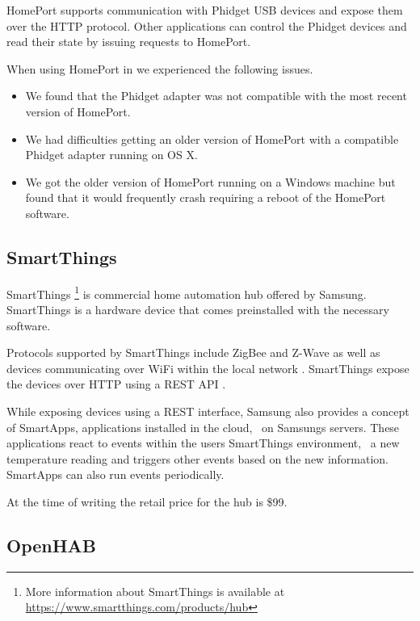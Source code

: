 HomePort supports communication with Phidget USB devices and expose them over the HTTP protocol. Other applications can control the Phidget devices and read their state by issuing requests to HomePort.

When using HomePort in \cite{prespecialisation} we experienced the following issues.

\begin{itemize}
\item We found that the Phidget adapter was not compatible with the most recent version of HomePort.
\item We had difficulties getting an older version of HomePort with a compatible Phidget adapter running on OS X.
\item We got the older version of HomePort running on a Windows machine but found that it would frequently crash requiring a reboot of the HomePort software.
\end{itemize}

\subsection{SmartThings}
\label{sec:analysis:choice-of-hub:smartthings}

SmartThings \cite{SMARTTHINGS}\footnote{More information about SmartThings is available at \url{https://www.smartthings.com/products/hub}} is commercial home automation hub offered by Samsung. SmartThings is a hardware device that comes preinstalled with the necessary software.

Protocols supported by SmartThings include ZigBee and Z-Wave as well as devices communicating over WiFi within the local network \cite{smartthings:compatible-products}. SmartThings expose the devices over HTTP using a REST API \cite{smartthings:developer}.

While exposing devices using a REST interface, Samsung also provides a concept of SmartApps, applications installed in the cloud, \ie~on Samsungs servers. These applications react to events within the users SmartThings environment, \ie~a new temperature reading and triggers other events based on the new information. SmartApps can also run events periodically.

At the time of writing the retail price for the hub is \$99.

\subsection{OpenHAB}
\label{sec:analysis:choice-of-hub:openhab}

